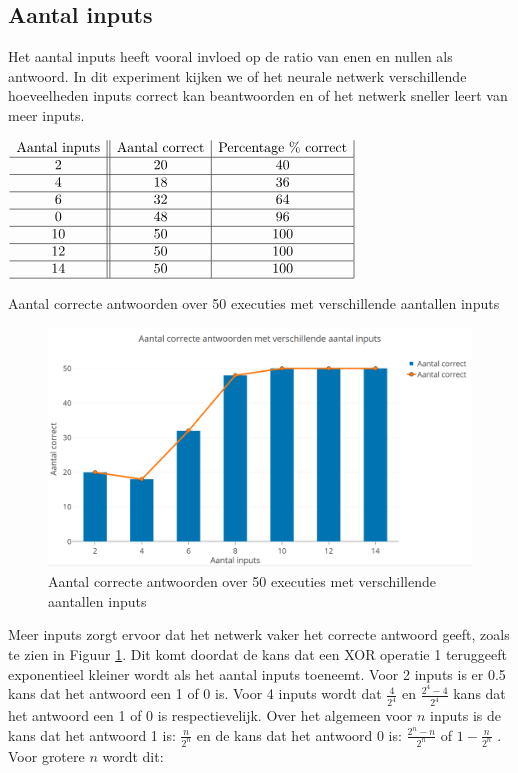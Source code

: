 \subsection{Aantal inputs}
Het aantal inputs heeft vooral invloed op de ratio van enen en nullen als antwoord. In dit experiment kijken we of het neurale netwerk verschillende hoeveelheden inputs correct kan beantwoorden en of het netwerk sneller leert van meer inputs.

\begin{table}[ht]
    \centering
      $\begin{array}{c||c|c |}
        \text{Aantal inputs} & \text{Aantal correct} & \text{Percentage \% correct} \\ \hline
        2 & 20 & 40 \\ \hline
        4 & 18 & 36 \\ \hline
        6 & 32 & 64 \\ \hline
        0 & 48 & 96 \\ \hline
        10 & 50 & 100 \\ \hline
        12 & 50 & 100 \\ \hline
        14 & 50 & 100 \\ \hline
      \end{array}$
    \caption{Aantal correcte antwoorden over 50 executies met verschillende aantallen inputs}
    \label{tab:inputs}
\end{table}

\begin{figure}[ht!]
    \centering
    \includegraphics[scale=0.3]{graphs/inputs.png}
    \caption{Aantal correcte antwoorden over 50 executies met verschillende aantallen inputs}
    \label{fig:inputs}
\end{figure}

Meer inputs zorgt ervoor dat het netwerk vaker het correcte antwoord geeft, zoals te zien in Figuur \ref{fig:inputs}. Dit komt doordat de kans dat een XOR operatie 1 teruggeeft exponentieel kleiner wordt als het aantal inputs toeneemt. Voor 2 inputs is er 0.5 kans dat het antwoord een 1 of 0 is. Voor 4 inputs wordt dat $\frac{4}{2^4}$ en $\frac{2^4-4}{2^4}$ kans dat het antwoord een 1 of 0 is respectievelijk. Over het algemeen voor $n$ inputs is de kans dat het antwoord 1 is: $\frac{n}{2^n}$ en de kans dat het antwoord 0 is: $\frac{2^n-n}{2^n}$ of $1-\frac{n}{2^n}$ . Voor grotere $n$ wordt dit:

